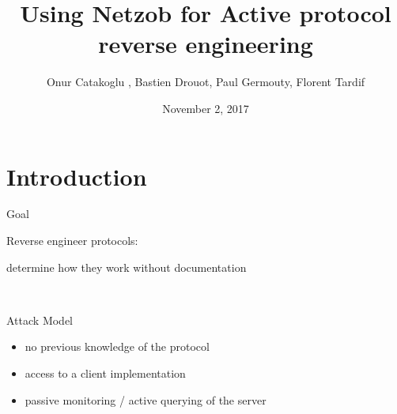 \documentclass{beamer}
\newcounter{m} %
\newcounter{c} %
\begin{document}




\title{Using Netzob for Active protocol reverse engineering }   
\author{Onur Catakoglu , Bastien Drouot, Paul Germouty, Florent Tardif} 
\date{November 2, 2017} 




\begin{frame}

	\titlepage
\end{frame}





\begin{frame}


	\tableofcontents

\end{frame}

\section{Introduction}
\begin{frame}
	\tableofcontents[currentsection]
\end{frame}

\begin{frame}{Goal}

  Reverse engineer protocols:

  determine how they work without documentation

  ~

  \begin{block}{Attack Model}
    \begin{itemize}
      \item no previous knowledge of the protocol
      \item access to a client implementation
      \item passive monitoring / active querying of the server
    \end{itemize}
  \end{block}

\end{frame}
\end{document}

